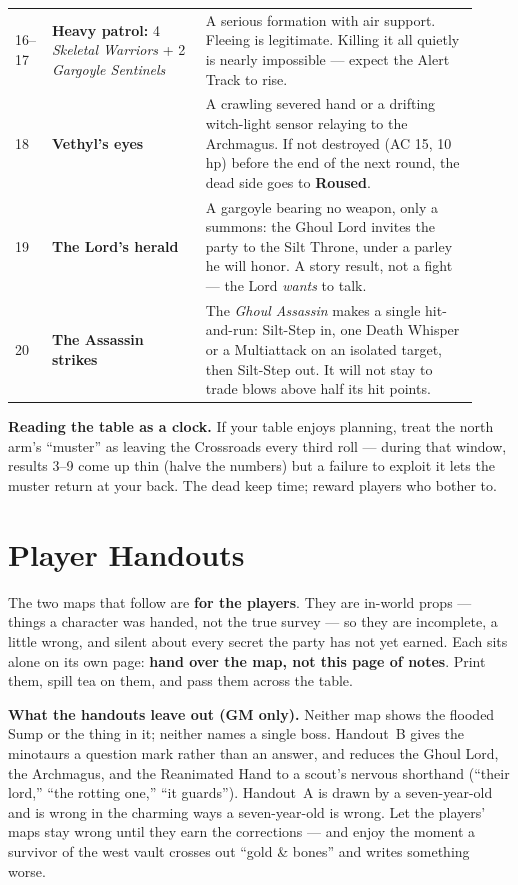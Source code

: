 \documentclass[10pt,twoside]{report}
\begin{document}
\begin{longtable}{@{}p{0.06\linewidth} p{0.31\linewidth} p{0.55\linewidth}@{}}
16--17 & \textbf{Heavy patrol:} 4 \emph{Skeletal Warriors} + 2 \emph{Gargoyle Sentinels} & A serious formation with air support. Fleeing is legitimate. Killing it all quietly is nearly impossible --- expect the Alert Track to rise. \\
18 & \textbf{Vethyl's eyes} & A crawling severed hand or a drifting witch-light sensor relaying to the Archmagus. If not destroyed (AC 15, 10 hp) before the end of the next round, the dead side goes to \textbf{Roused}. \\
19 & \textbf{The Lord's herald} & A gargoyle bearing no weapon, only a summons: the Ghoul Lord invites the party to the Silt Throne, under a parley he will honor. A story result, not a fight --- the Lord \emph{wants} to talk. \\
20 & \textbf{The Assassin strikes} & The \emph{Ghoul Assassin} makes a single hit-and-run: Silt-Step in, one Death Whisper or a Multiattack on an isolated target, then Silt-Step out. It will not stay to trade blows above half its hit points. \\
\bottomrule
\end{longtable}

\begin{gmnote}
\textbf{Reading the table as a clock.} If your table enjoys planning, treat the north arm's ``muster'' as leaving the Crossroads every third roll --- during that window, results 3--9 come up thin (halve the numbers) but a failure to exploit it lets the muster return at your back. The dead keep time; reward players who bother to.
\end{gmnote}

\chapter{Player Handouts}
\noindent The two maps that follow are \textbf{for the players}. They are in-world props --- things a character was handed, not the true survey --- so they are incomplete, a little wrong, and silent about every secret the party has not yet earned. Each sits alone on its own page: \textbf{hand over the map, not this page of notes}. Print them, spill tea on them, and pass them across the table.

\begin{gmnote}
\textbf{What the handouts leave out (GM only).} Neither map shows the flooded Sump or the thing in it; neither names a single boss. Handout~B gives the minotaurs a question mark rather than an answer, and reduces the Ghoul Lord, the Archmagus, and the Reanimated Hand to a scout's nervous shorthand (``their lord,'' ``the rotting one,'' ``it guards''). Handout~A is drawn by a seven-year-old and is wrong in the charming ways a seven-year-old is wrong. Let the players' maps stay wrong until they earn the corrections --- and enjoy the moment a survivor of the west vault crosses out ``gold \& bones'' and writes something worse.
\end{gmnote}
\clearpage
\end{document}

